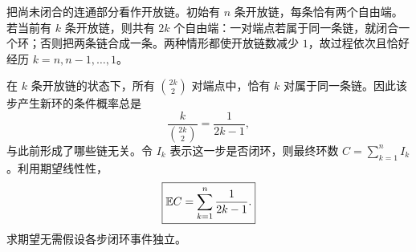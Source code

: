 把尚未闭合的连通部分看作开放链。初始有 $n$ 条开放链，每条恰有两个自由端。若当前有 $k$ 条开放链，则共有 $2k$ 个自由端：一对端点若属于同一条链，就闭合一个环；否则把两条链合成一条。两种情形都使开放链数减少 $1$，故过程依次且恰好经历 $k=n,n-1,\ldots,1$。

在 $k$ 条开放链的状态下，所有 $\binom{2k}{2}$ 对端点中，恰有 $k$ 对属于同一条链。因此该步产生新环的条件概率总是
\[
\frac{k}{\binom{2k}{2}}=\frac1{2k-1},
\]
与此前形成了哪些链无关。令 $I_k$ 表示这一步是否闭环，则最终环数 $C=\sum_{k=1}^n I_k$。利用期望线性性，
\[
\boxed{\mathbb{E} C=\sum_{k=1}^n\frac1{2k-1}.}
\]
求期望无需假设各步闭环事件独立。
